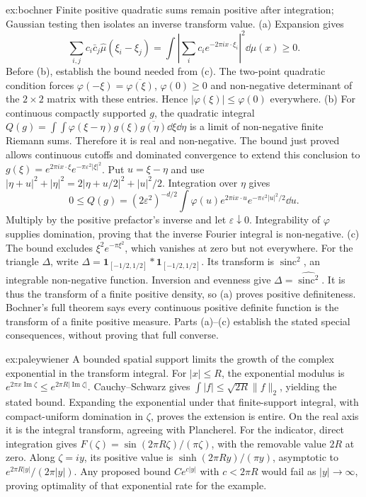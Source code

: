 \begin{solution}{ex:bochner}
\idea Finite positive quadratic sums remain positive after integration; Gaussian testing then isolates an inverse transform value.
\writeup (a) Expansion gives
\[
\sum_{i,j}c_i\bar c_j\hat\mu(\xi_i-\xi_j)
=\int\left|\sum_ic_ie^{-2\pi ix\cdot\xi_i}\right|^2\dd\mu(x)\ge0.
\]
Before (b), establish the bound needed from (c). The two-point quadratic condition forces $\varphi(-\xi)=\overline{\varphi(\xi)}$, $\varphi(0)\ge0$ and non-negative determinant of the $2\times2$ matrix with these entries. Hence $|\varphi(\xi)|\le\varphi(0)$ everywhere.
(b) For continuous compactly supported $g$, the quadratic integral
$Q(g)=\int\!\int\varphi(\xi-\eta)g(\xi)\overline{g(\eta)}\dd\xi\dd\eta$
is a limit of non-negative finite Riemann sums. Therefore it is real and non-negative. The bound just proved allows continuous cutoffs and dominated convergence to extend this conclusion to
$g(\xi)=e^{2\pi ix\cdot\xi}e^{-\pi\varepsilon^2|\xi|^2}$.
Put $u=\xi-\eta$ and use $|\eta+u|^2+|\eta|^2=2|\eta+u/2|^2+|u|^2/2$. Integration over $\eta$ gives
\[
0\le Q(g)=(2\varepsilon^2)^{-d/2}
\int\varphi(u)e^{2\pi ix\cdot u}e^{-\pi\varepsilon^2|u|^2/2}\dd u.
\]
Multiply by the positive prefactor's inverse and let $\varepsilon\downarrow0$. Integrability of $\varphi$ supplies domination, proving that the inverse Fourier integral is non-negative.
(c) The bound excludes $\xi^2e^{-\pi\xi^2}$, which vanishes at zero but not everywhere. For the triangle $\Delta$, write $\Delta=\mathbf1_{[-1/2,1/2]}*\mathbf1_{[-1/2,1/2]}$. Its transform is $\operatorname{sinc}^2$, an integrable non-negative function. Inversion and evenness give $\Delta=\widehat{\operatorname{sinc}^2}$. It is thus the transform of a finite positive density, so (a) proves positive definiteness.
Bochner's full theorem says every continuous positive definite function is the transform of a finite positive measure. Parts (a)--(c) establish the stated special consequences, without proving that full converse.
\end{solution}

\begin{solution}{ex:paleywiener}
\idea A bounded spatial support limits the growth of the complex exponential in the transform integral.
\writeup For $|x|\le R$, the exponential modulus is $e^{2\pi x\operatorname{Im}\zeta}\le e^{2\pi R|\operatorname{Im}\zeta|}$. Cauchy--Schwarz gives $\int|f|\le\sqrt{2R}\|f\|_2$, yielding the stated bound. Expanding the exponential under that finite-support integral, with compact-uniform domination in $\zeta$, proves the extension is entire. On the real axis it is the integral transform, agreeing with Plancherel.
For the indicator, direct integration gives $F(\zeta)=\sin(2\pi R\zeta)/(\pi\zeta)$, with the removable value $2R$ at zero. Along $\zeta=iy$, its positive value is $\sinh(2\pi Ry)/(\pi y)$, asymptotic to $e^{2\pi R|y|}/(2\pi|y|)$. Any proposed bound $Ce^{c|y|}$ with $c<2\pi R$ would fail as $|y|\to\infty$, proving optimality of that exponential rate for the example.
\end{solution}

